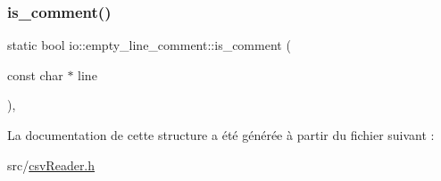 \subsubsection{\texorpdfstring{is\+\_\+comment()}{is\_comment()}}
{\footnotesize\ttfamily static bool io\+::empty\+\_\+line\+\_\+comment\+::is\+\_\+comment (\begin{DoxyParamCaption}\item[{const char $\ast$}]{line }\end{DoxyParamCaption})\hspace{0.3cm}{\ttfamily [inline]}, {\ttfamily [static]}}



La documentation de cette structure a été générée à partir du fichier suivant \+:\begin{DoxyCompactItemize}
\item 
src/\hyperlink{csvReader_8h}{csv\+Reader.\+h}\end{DoxyCompactItemize}
